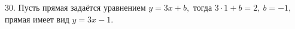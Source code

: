 30. Пусть прямая задаётся уравнением $y=3x+b,$ тогда $3\cdot1+b=2,\ b=-1,$ прямая имеет вид $y=3x-1.$\\
